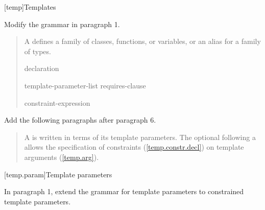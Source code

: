 
\setcounter{chapter}{16}
[temp]{Templates}

Modify the  grammar in paragraph 1.

\begin{quote}
\pnum
A  defines a family of classes, functions, or variables, or an alias for a
family of types.

\begin{bnf}
\br
    declaration\br

\begin{addedblock}
\br
   \terminal{<} template-parameter-list \terminal{>} requires-clause\opt\br
\end{addedblock}

\begin{addedblock}
\br
   constraint-expression
\end{addedblock}
\end{bnf}

\end{quote}
  
Add the following paragraphs after paragraph 6.

\begin{quote}
\begin{addedblock}
\setcounter{Paras}{6}
\pnum
A  is written in terms of its template 
parameters. 
%
The optional  following a
 allows the specification of
constraints (\ref{temp.constr.decl}) on template arguments (\ref{temp.arg}).
\end{addedblock}
\end{quote}


[temp.param]{Template parameters}

In paragraph 1, extend the grammar for template parameters to 
constrained template parameters.

